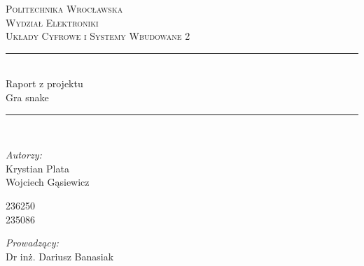 \documentclass[12pt]{article}
\begin{document}
\begin{titlepage}

\newcommand{\HRule}{\rule{\linewidth}{0.5mm}} %

\center %
\vspace*{\fill}

\textsc{\LARGE Politechnika Wrocławska}\\[0.5cm] %
\textsc{\Large Wydział Elektroniki}\\[1.5cm] %
\textsc{\large Układy Cyfrowe i Systemy Wbudowane 2}\\[0.5cm] %


\HRule \\[0.1cm]
{ \Huge Raport z projektu\\\vspace{10pt}Gra snake}\\[0.1cm] %
\HRule \\[1.5cm]
 

\begin{minipage}{0.3\textwidth}
\begin{flushleft} \large
\textit{Autorzy:}\\
Krystian Plata\\
Wojciech Gąsiewicz\\
\end{flushleft}
\end{minipage}
\begin{minipage}{0.2\textwidth}
\begin{flushleft}\large
\vspace{\baselineskip}
236250\\
235086\\
\end{flushleft}
\end{minipage}
\begin{minipage}{0.4\textwidth}
\begin{flushright} \large
\emph{Prowadzący:} \\
Dr inż. Dariusz Banasiak\\ %
\end{flushright}
\end{minipage}\\


\end{titlepage}
\end{document}
